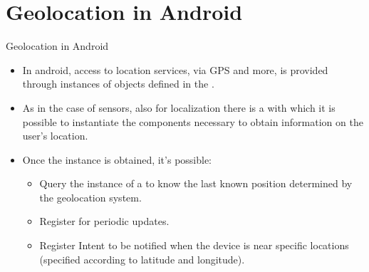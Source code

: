 \documentclass{beamer}
\begin{document}
\section{Geolocation in Android}
  \begin{frame}{Geolocation in Android}
    \begin{itemize}\itemsep10pt
      \item In android, access to location services, via GPS and more, is
      provided through instances of objects defined in the
      .
      \item As in the case of sensors, also for localization there is a
       with which it is possible to instantiate the
      components necessary to obtain information on the user's location.
      \item Once the  instance is obtained, it's
      possible: 
      \begin{itemize}
        \item Query the instance of a  to know the last
        known position determined by the geolocation system.
        \item Register for periodic updates.
        \item Register Intent to be notified when the device is near specific
        locations (specified according to latitude and longitude).
      \end{itemize}
    \end{itemize}
  \end{frame}
\end{document}
